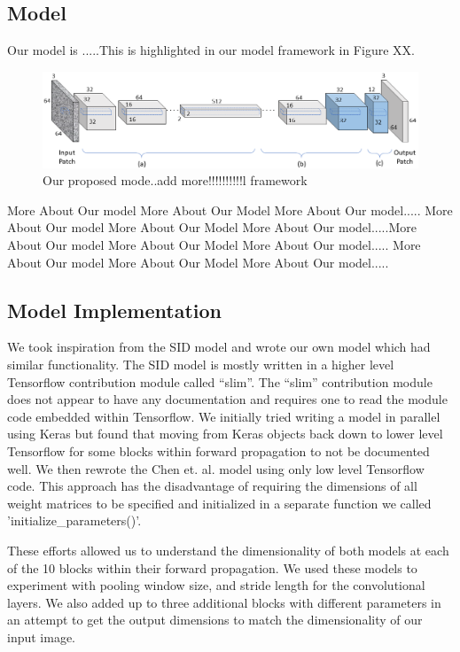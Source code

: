\documentclass{article}
\begin{document}
\subsection{Model}

Our model is .....This is highlighted in our model framework in Figure XX. 

\begin{figure}[ht]
  \centering
  \includegraphics[scale=0.36]{model}
  \caption{Our proposed mode..add more!!!!!!!!!!l framework}
\end{figure}

More About Our model
More About Our Model
More About Our model.....
More About Our model
More About Our Model
More About Our model.....More About Our model
More About Our Model
More About Our model.....
More About Our model
More About Our Model
More About Our model.....


\subsection{Model Implementation}

We took inspiration from the SID model and wrote our own model which
had similar functionality. The SID model is mostly written in a higher
level Tensorflow contribution module called ``slim''. The ``slim''
contribution module does not appear to have any documentation and requires
one to read the module code embedded within Tensorflow. We initially tried
writing a model in parallel using Keras but found that moving from Keras
objects back down to lower level Tensorflow for some blocks within
forward propagation to not be documented well. We then rewrote the
Chen et. al. \cite{chen2018learning} model using only low level Tensorflow
code. This approach has the disadvantage of requiring the dimensions of
all weight matrices to be specified and initialized in a separate function
we called 'initialize\_parameters()'. \newline

These efforts allowed us to understand the dimensionality of both models at
each of the 10 blocks within their forward propagation. We used these
models to experiment with pooling window size, and stride
length for the convolutional layers. We also added up
to three additional blocks with different parameters in an attempt to
get the output dimensions to match the dimensionality of our input
image. \newline
\end{document}
